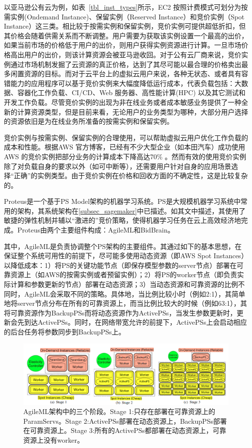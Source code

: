 以亚马逊公有云为例，如表~\ref{tbl_inst_types}所示，EC2 按照计费模式可划分为按需实例(Ondemand Instance)、保留实例（Reserved Instance）和竞价实例（Spot Instance）这三类。相比较于按需实例和保留实例，竞价实例可提供超低折扣，但其价格会随着供需关系而不断调整。用户需要为获取该实例设置一个最高的出价，如果当前市场的价格低于用户的出价，则用户获得实例资源进行计算。一旦市场价格高出用户的出价，则该计算资源会被亚马逊收回。对于公有云厂商来说，竞价实例通过市场机制发掘了云资源的真正价格，达到了其尽可能以最合理的价格卖出最多闲置资源的目标。而对于云平台上的虚拟云用户来说，各种无状态、或者具有容错能力的应用程序可以基于竞价实例来大幅度降低运行成本，代表负载包括：大数据、容器化工作负载、CI/CD、Web 服务器、高性能计算(HPC) 以及其它测试和开发工作负载。尽管竞价实例的出现为非在线业务或者成本敏感业务提供了一种全新的计算资源类型，但是目前来看，无论用户的业务类型为哪种，大部分用户选择的资源依旧是为在线业务所准备的按需实例和保留实例。

竞价实例与按需实例、保留实例的合理使用，可以帮助虚拟云用户优化工作负载的成本和性能。根据AWS 官方博客，已经有不少大型企业（如本田汽车）成功使用AWS 的竞价实例把部分业务的计算成本下降高达70\% 。然而有效的使用竞价实例除了对负载自身的要求以外（如可中断等），还需要用户针对自身的应用场景选择“正确”的实例类型。由于竞价实例在价格和回收方面的不确定性，这是比较复杂的。

Proteus\parencite{harlap2017proteus}是一个基于PS Model架构的机器学习系统。PS是大规模机器学习系统中常用的架构，其系统架构在\ref{subsec_sagemaker}中已描述。如其文中描述，其使用了敏捷的弹性机制并辅以“激进的”竞价策略，使得机器学习任务在云上高效经济地完成。Proteus由两个主要组件构成：AgileML和BidBrain。

其中，AgileML是负责协调整个PS架构的主要组件。其通过如下的基本思想，在保证整个系统可用性的前提下，尽可能多使用动态资源（即AWS Spot Instances）以降低成本：1）将PS的关键功能节点（即保存模型参数的server节点）部署在可靠资源上（如AWS的按需实例或者预留实例）；2）将PS的worker节点（即负责实际计算和参数更新的节点）部署在动态资源；3）当动态资源和可靠资源的比例不同时，AgileML会采取不同的策略。具体地，当比例比较小时（例如2:1），其简单地将server节点分布在所有的可靠资源上，而当比例比较大的时候（例如63:1），其将可靠资源作为BackupPSs而将动态资源作为ActivePSs，当发生参数更新时，更新会先到达ActivePSs。同时，在网络带宽允许的前提下，ActivePSs上会启动相应的后台任务将参数同步到BackupPSs上。

\begin{figure}[h]
    \centerline{\includegraphics[width=\textwidth]{figures/agileml-stages.png}}
    \caption{AgileML架构中的三个阶段。Stage 1:只存在部署在可靠资源上的ParamServs。Stage 2:ActivePSs部署在动态资源上，BackupPSs部署在可靠资源上。Stage 3:所有的ActivePSs都部署在动态资源上，可靠资源上没有worker。}
    \label{agileml_stages}
\end{figure}

